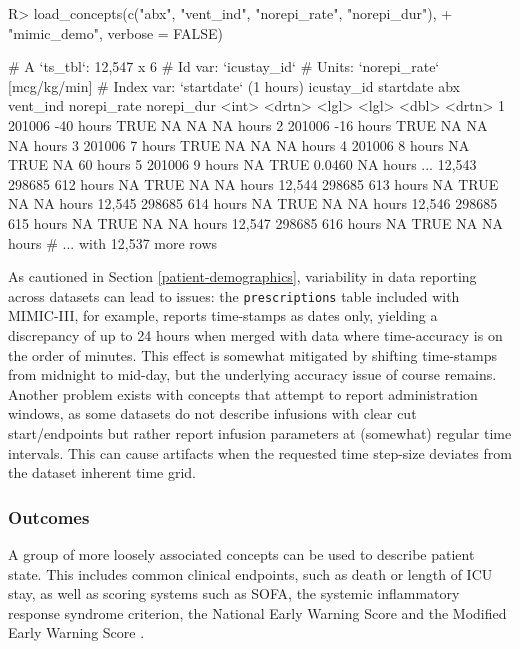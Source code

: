 \documentclass[
  notitle]{jss}
\begin{document}
\begin{CodeChunk}
\begin{CodeInput}
R> load_concepts(c("abx", "vent_ind", "norepi_rate", "norepi_dur"),
+               "mimic_demo", verbose = FALSE)
\end{CodeInput}
\begin{CodeOutput}
# A `ts_tbl`: 12,547 x 6
# Id var:     `icustay_id`
# Units:      `norepi_rate` [mcg/kg/min]
# Index var:  `startdate` (1 hours)
       icustay_id startdate abx   vent_ind norepi_rate norepi_dur
            <int> <drtn>    <lgl> <lgl>          <dbl> <drtn>
     1     201006 -40 hours TRUE  NA           NA      NA hours
     2     201006 -16 hours TRUE  NA           NA      NA hours
     3     201006   7 hours TRUE  NA           NA      NA hours
     4     201006   8 hours NA    TRUE         NA      60 hours
     5     201006   9 hours NA    TRUE          0.0460 NA hours
   ...
12,543     298685 612 hours NA    TRUE         NA      NA hours
12,544     298685 613 hours NA    TRUE         NA      NA hours
12,545     298685 614 hours NA    TRUE         NA      NA hours
12,546     298685 615 hours NA    TRUE         NA      NA hours
12,547     298685 616 hours NA    TRUE         NA      NA hours
# ... with 12,537 more rows
\end{CodeOutput}
\end{CodeChunk}

As cautioned in Section \ref{patient-demographics}, variability in data
reporting across datasets can lead to issues: the \texttt{prescriptions}
table included with MIMIC-III, for example, reports time-stamps as dates
only, yielding a discrepancy of up to 24 hours when merged with data
where time-accuracy is on the order of minutes. This effect is somewhat
mitigated by shifting time-stamps from midnight to mid-day, but the
underlying accuracy issue of course remains. Another problem exists with
concepts that attempt to report administration windows, as some datasets
do not describe infusions with clear cut start/endpoints but rather
report infusion parameters at (somewhat) regular time intervals. This
can cause artifacts when the requested time step-size deviates from the
dataset inherent time grid.

\hypertarget{outcomes}{%
\subsubsection{Outcomes}\label{outcomes}}

A group of more loosely associated concepts can be used to describe
patient state. This includes common clinical endpoints, such as death or
length of ICU stay, as well as scoring systems such as SOFA, the
systemic inflammatory response syndrome \citep[SIRS;][]{bone1992}
criterion, the National Early Warning Score \citep[NEWS;][]{jones2012}
and the Modified Early Warning Score \citep[MEWS;][]{subbe2001}.
\end{document}
